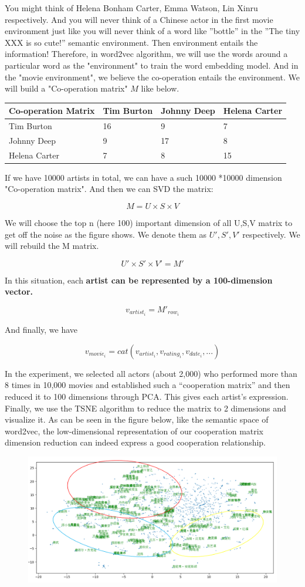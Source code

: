 \documentclass[11pt,a4paper]{article}
\begin{document}
You might think of Helena Bonham Carter, Emma Watson, Lin Xinru
respectively. And you will never think of a Chinese actor in the first
movie environment just like you will never think of a word like
''bottle'' in the ''The tiny XXX is so cute!'' semantic environment.
Then environment entails the information! Therefore, in word2vec
algorithm, we will use the words around a particular word as the
"environment" to train the word embedding model. And in the "movie
environment", we believe the co-operation entails the environment. We
will build a "Co-operation matrix" \(M\) like below.

\begin{longtable}[]{@{}llll@{}}
\toprule
Co-operation Matrix & Tim Burton & Johnny Deep & Helena
Carter\tabularnewline
\midrule
\endhead
Tim Burton & 16 & 9 & 7\tabularnewline
Johnny Deep & 9 & 17 & 8\tabularnewline
Helena Carter & 7 & 8 & 15\tabularnewline
\bottomrule
\end{longtable}

If we have 10000 artists in total, we can have a such 10000 *10000
dimension "Co-operation matrix". And then we can SVD the matrix:

\[M = U\times S\times V\]

We will choose the top n (here 100) important dimension of all U,S,V
matrix to get off the noise as the figure shows. We denote them as
\(U',S',V'\) respectively. We will rebuild the M matrix.

\[U'\times S'\times V' = M'\]

In this situation, each \textbf{artist can be represented by a
100-dimension vector.}

\[v_{artist_{i}} = M'_{row_{i}}\]

And finally, we have

\[v_{movie_i} = cat(v_{artist_i},v_{rating_i}, v_{date_i},...)\]

In the experiment, we selected all actors (about 2,000) who performed
more than 8 times in 10,000 movies and established such a ``cooperation
matrix'' and then reduced it to 100 dimensions through PCA. This gives
each artist's expression. Finally, we use the TSNE algorithm to reduce
the matrix to 2 dimensions and visualize it. As can be seen in the
figure below, like the semantic space of word2vec, the low-dimensional
representation of our cooperation matrix dimension reduction can indeed
express a good cooperation relationship.

\begin{figure}
\centering
\includegraphics[width=\columnwidth]{10.png}
\caption{}
\end{figure}
\end{document}
